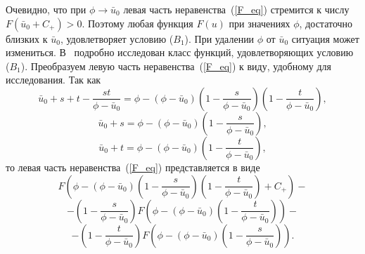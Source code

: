 \documentclass[12pt]{article}
\begin{document}
Очевидно, что при $\phi \to \bar u_0$ левая часть неравенства~(\ref{F_eq}) стремится к числу $F(\bar u_0 + C_+) > 0$. Поэтому любая функция $F(u)$ при значениях $\phi$, достаточно близких к $\bar u_0$, удовлетворяет условию (\textit{$B_1$}). При удалении $\phi$ от $\bar u_0$ ситуация может измениться. В~\cite{tula} подробно исследован класс функций, удовлетворяющих условию (\textit{$B_1$}). Преобразуем левую часть неравенства~(\ref{F_eq}) к виду, удобному для исследования. Так как
\begin{equation*}
	\bar u_0 + s + t - \frac{s t}{\phi - \bar u_0} = \phi - (\phi - \bar u_0) \left( 1 - \frac{s}{\phi - \bar u_0} \right) 
\left( 1 - \frac{t}{\phi - \bar u_0} \right),
\end{equation*}
\begin{equation*}
	\bar u_0 + s = \phi - (\phi - \bar u_0) \left( 1 - \frac{s}{\phi - \bar u_0} \right),
\end{equation*}
\begin{equation*}
	\bar u_0 + t = \phi - (\phi - \bar u_0) \left( 1 - \frac{t}{\phi - \bar u_0} \right),
\end{equation*}
то левая часть неравенства~(\ref{F_eq}) представляется в виде
\begin{equation*}
	F \left( \phi - (\phi - \bar u_0) \left( 1 - \frac{s}{\phi - \bar u_0} \right) \left( 1 - \frac{t}{\phi - \bar u_0} \right) 
+ C_+ \right) -
\end{equation*}
\begin{equation*}
	- \left( 1 - \frac{s}{\phi - \bar u_0} \right) F \left( \phi - (\phi - \bar u_0) \left( 1 - \frac{t}{\phi - \bar u_0} \right) \right) -
\end{equation*}
\begin{equation*}
	- \left( 1 - \frac{t}{\phi - \bar u_0} \right) F \left( \phi - (\phi - \bar u_0) \left( 1 - \frac{s}{\phi - \bar u_0} \right) \right) .
\end{equation*}

\newpage
\end{document}
